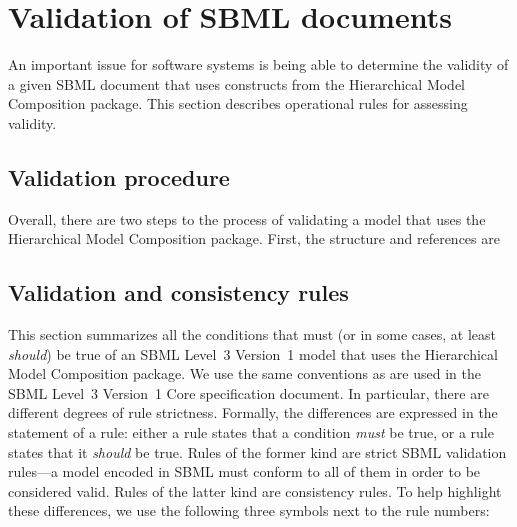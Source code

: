 
\section{Validation of SBML documents}
\label{apdx-validation}

An important issue for software systems is being able to determine the
validity of a given SBML document that uses constructs from the
Hierarchical Model Composition package.  This section describes
operational rules for assessing validity.  


\subsection{Validation procedure}
\label{validation-procedure}

Overall, there are two steps to the process of validating a model that
uses the Hierarchical Model Composition package.  First, the structure
and references are 



\subsection{Validation and consistency rules}
\label{validation-rules}

This section summarizes all the conditions that must (or in some cases,
at least \emph{should}) be true of an SBML Level~3 Version~1 model that
uses the Hierarchical Model Composition package.  We use the same
conventions as are used in the SBML Level~3 Version~1 Core specification
document.  In particular, there are different degrees of rule
strictness.  Formally, the differences are expressed in the statement of
a rule: either a rule states that a condition \emph{must} be true, or a
rule states that it \emph{should} be true.  Rules of the former kind are
strict SBML validation rules---a model encoded in SBML must conform to
all of them in order to be considered valid.  Rules of the latter kind
are consistency rules.  To help highlight these differences, we use the
following three symbols next to the rule numbers:

